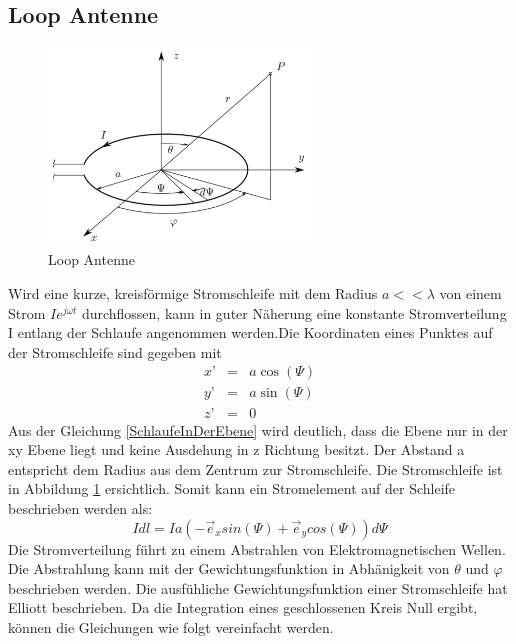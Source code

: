 \newpage
\subsection{Loop Antenne}\label{sec:LoopAntenneTheorie}
\begin{figure}[h]
	\centering
	\includegraphics[width=7cm]{content/bilder/Loop_EMANT_S45.pdf}%
	\caption{Loop Antenne}
	\label{LoopAntenne}
\end{figure}
Wird eine kurze, kreisförmige Stromschleife mit dem Radius $a<<\lambda$ von einem Strom $Ie^{j\omega t}$ durchflossen,  kann in guter Näherung eine konstante Stromverteilung I entlang der Schlaufe angenommen werden.Die Koordinaten eines Punktes auf der Stromschleife sind gegeben mit
\begin{eqnarray}
x’ &=& a \cos(\Psi)\\
y’ &=& a \sin(\Psi)\\
z’ &=& 0\label{SchlaufeInDerEbene}
\end{eqnarray}
Aus der Gleichung \ref{SchlaufeInDerEbene} wird deutlich, dass die Ebene nur in der xy Ebene liegt und keine Ausdehung in z Richtung besitzt.
Der Abstand  a entspricht dem Radius  aus dem Zentrum zur Stromschleife. Die Stromschleife ist in  Abbildung \ref{LoopAntenne} ersichtlich. Somit kann ein Stromelement auf der Schleife beschrieben werden als:
\begin{equation}
I dl= Ia(- \vec e_{x}sin(\Psi)+\vec e_{y}cos(\Psi))d\Psi
\end{equation}
Die Stromverteilung führt zu einem Abstrahlen von Elektromagnetischen Wellen. Die Abstrahlung kann mit der Gewichtungsfunktion in Abhänigkeit von $\theta$ und $\varphi$ beschrieben werden. Die ausfühliche Gewichtungsfunktion einer Stromschleife hat Elliott \cite{elliott1981antenna}beschrieben. Da die Integration eines geschlossenen Kreis Null ergibt, können die Gleichungen wie folgt vereinfacht werden.


